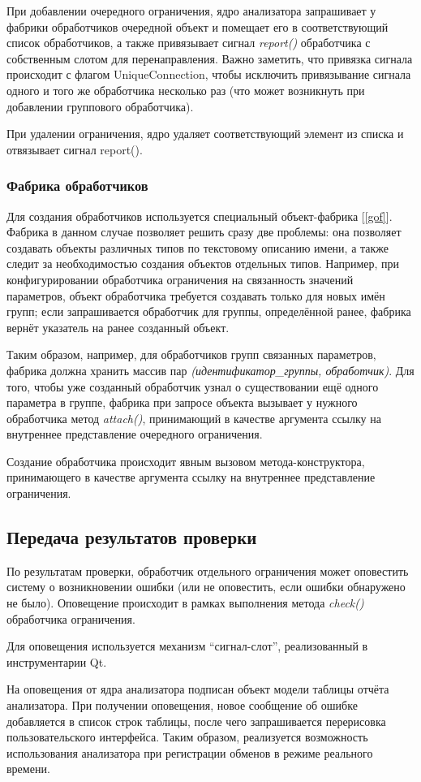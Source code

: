 При добавлении очередного ограничения, ядро анализатора запрашивает у фабрики 
обработчиков очередной объект и помещает его в соответствующий список 
обработчиков, а также привязывает сигнал \textit{report()} обработчика с 
собственным слотом для перенаправления. Важно заметить, что привязка сигнала 
происходит с флагом UniqueConnection, чтобы исключить привязывание сигнала 
одного и того же обработчика несколько раз (что может возникнуть при добавлении 
группового обработчика).

При удалении ограничения, ядро удаляет соответствующий элемент из списка и 
отвязывает сигнал report().

\subsubsection{Фабрика обработчиков}

Для создания обработчиков используется специальный объект-фабрика [\ref{gof}]. 
Фабрика в данном случае позволяет решить сразу две проблемы: она позволяет 
создавать объекты различных типов по текстовому описанию имени, а также следит 
за необходимостью создания объектов отдельных типов. Например, при 
конфигурировании обработчика ограничения на связанность значений параметров, 
объект обработчика требуется создавать только для новых имён групп; если 
запрашивается обработчик для группы, определённой ранее, фабрика вернёт 
указатель на ранее созданный объект.

Таким образом, например, для обработчиков групп связанных параметров, фабрика 
должна хранить массив пар \textit{(идентификатор\_группы, обработчик)}. Для 
того, чтобы уже созданный обработчик узнал о существовании ещё одного параметра 
в группе, фабрика при запросе объекта вызывает у нужного обработчика метод 
\textit{attach()}, принимающий в качестве аргумента ссылку на внутреннее 
представление очередного ограничения.

Создание обработчика происходит явным вызовом метода-конструктора, принимающего 
в качестве аргумента ссылку на внутреннее представление ограничения.

\subsection{Передача результатов проверки}

По результатам проверки, обработчик отдельного ограничения может оповестить 
систему о возникновении ошибки (или не оповестить, если ошибки обнаружено не 
было). Оповещение происходит в рамках выполнения метода \textit{check()} 
обработчика ограничения.

Для оповещения используется механизм ``сигнал-слот'', реализованный в 
инструментарии Qt.

На оповещения от ядра анализатора подписан объект модели таблицы отчёта 
анализатора. При получении оповещения, новое сообщение об ошибке добавляется в 
список строк таблицы, после чего запрашивается перерисовка пользовательского 
интерфейса. Таким образом, реализуется возможность использования анализатора при 
регистрации обменов в режиме реального времени.